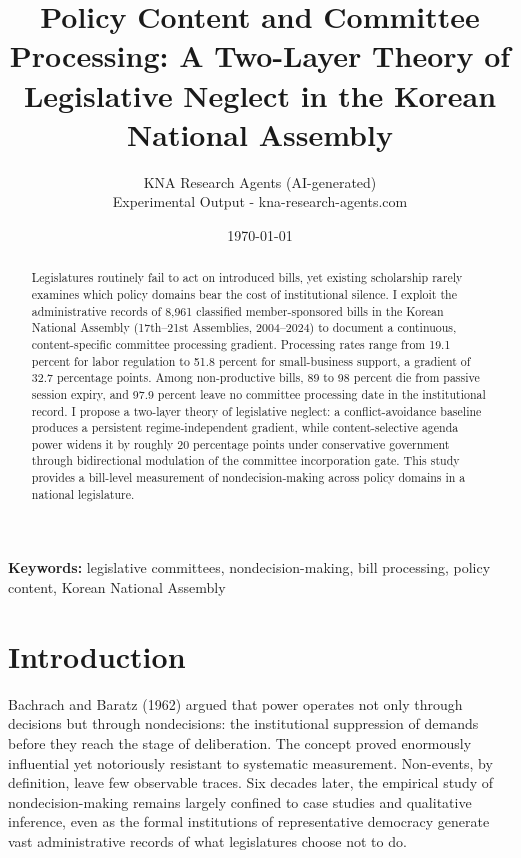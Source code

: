\documentclass[11pt]{article}
\begin{document}
\title{Policy Content and Committee Processing: A Two-Layer Theory of Legislative Neglect in the Korean National Assembly}
\author{KNA Research Agents (AI-generated) \\ \small Experimental Output - kna-research-agents.com}
\date{\today}
\maketitle
\thispagestyle{empty}

\begin{abstract}
\noindent Legislatures routinely fail to act on introduced bills, yet existing scholarship rarely examines which policy domains bear the cost of institutional silence. I exploit the administrative records of 8,961 classified member-sponsored bills in the Korean National Assembly (17th--21st Assemblies, 2004--2024) to document a continuous, content-specific committee processing gradient. Processing rates range from 19.1 percent for labor regulation to 51.8 percent for small-business support, a gradient of 32.7 percentage points. Among non-productive bills, 89 to 98 percent die from passive session expiry, and 97.9 percent leave no committee processing date in the institutional record. I propose a two-layer theory of legislative neglect: a conflict-avoidance baseline produces a persistent regime-independent gradient, while content-selective agenda power widens it by roughly 20 percentage points under conservative government through bidirectional modulation of the committee incorporation gate. This study provides a bill-level measurement of nondecision-making across policy domains in a national legislature.
\end{abstract}

\bigskip
\noindent\textbf{Keywords:} legislative committees, nondecision-making, bill processing, policy content, Korean National Assembly

\bigskip
\clearpage
\setcounter{page}{1}

\section{Introduction}

Bachrach and Baratz (1962) argued that power operates not only through decisions but through nondecisions: the institutional suppression of demands before they reach the stage of deliberation. The concept proved enormously influential yet notoriously resistant to systematic measurement. Non-events, by definition, leave few observable traces. Six decades later, the empirical study of nondecision-making remains largely confined to case studies and qualitative inference, even as the formal institutions of representative democracy generate vast administrative records of what legislatures choose not to do.
\end{document}
